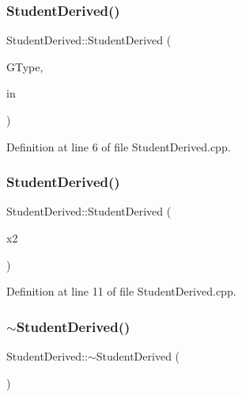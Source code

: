 \subsubsection{\texorpdfstring{StudentDerived()}{StudentDerived()}\hspace{0.1cm}{\footnotesize\ttfamily [2/3]}}
{\footnotesize\ttfamily Student\+Derived\+::\+Student\+Derived (\begin{DoxyParamCaption}\item[{const string \&}]{G\+Type,  }\item[{std\+::istream \&}]{in }\end{DoxyParamCaption})}



Definition at line 6 of file Student\+Derived.\+cpp.

\mbox{\label{class_student_derived_ab3424c39db6405828691800f395ba06b}} 
\subsubsection{\texorpdfstring{StudentDerived()}{StudentDerived()}\hspace{0.1cm}{\footnotesize\ttfamily [3/3]}}
{\footnotesize\ttfamily Student\+Derived\+::\+Student\+Derived (\begin{DoxyParamCaption}\item[{const \mbox{\hyperlink{class_student_derived}{Student\+Derived}} \&}]{x2 }\end{DoxyParamCaption})}



Definition at line 11 of file Student\+Derived.\+cpp.

\mbox{\label{class_student_derived_ab82e183e7428ca1f19f2219bc3b119f4}} 
\subsubsection{\texorpdfstring{$\sim$StudentDerived()}{~StudentDerived()}}
{\footnotesize\ttfamily Student\+Derived\+::$\sim$\+Student\+Derived (\begin{DoxyParamCaption}{ }\end{DoxyParamCaption})\hspace{0.3cm}{\ttfamily [default]}}



